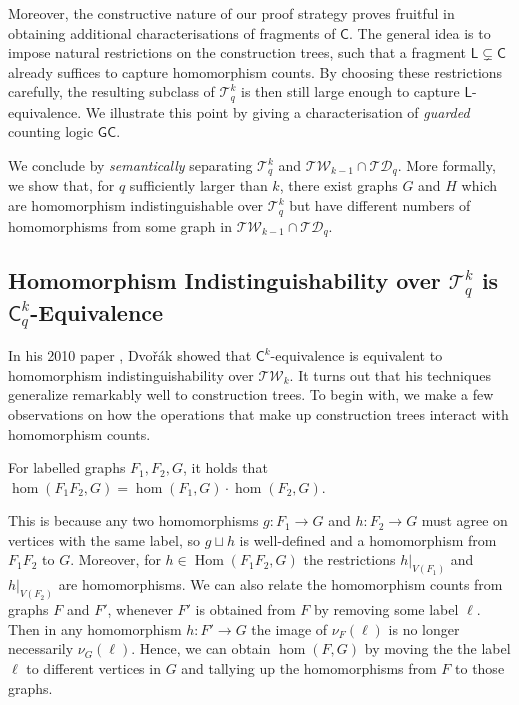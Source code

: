 \documentclass[a4paper,UKenglish,cleveref, autoref, thm-restate]{lipics-v2021}
\newcommand{\TW}{\ensuremath{\mathcal{TW}}}
\newcommand{\Ekq}{\ensuremath{\mathcal{T}_{q}^{k}}}
\newcommand{\lC} {\ensuremath{\mathsf C}}
\newcommand{\lL} {\ensuremath{\mathsf L}}
\newcommand{\lGC}{\ensuremath{\mathsf{GC}}}
\DeclareMathOperator{\HOM}{Hom}
\newcommand\restrict[1]{\vert_{#1}}
\begin{document}
Moreover, the constructive nature of our proof strategy proves fruitful in obtaining additional characterisations of fragments of $\lC$. The general idea is to impose natural restrictions on the construction trees, such that a fragment $\lL \subsetneq \lC$ already suffices to capture homomorphism counts. By choosing these restrictions carefully, the resulting subclass of $\Ekq$ is then still large enough to capture $\lL$-equivalence. We illustrate this point by giving a characterisation of \emph{guarded} counting logic $\lGC$.

We conclude by \emph{semantically} separating $\Ekq$ and $\mathcal{TW}_{k-1} \cap \mathcal{TD}_q$. More formally, we show that, for $q$ sufficiently larger than $k$, there exist graphs $G$ and $H$ which are homomorphism indistinguishable over $\Ekq$ but have different numbers of homomorphisms from some graph in $\mathcal{TW}_{k-1} \cap \mathcal{TD}_q$.


 
\subsection{Homomorphism Indistinguishability over $\Ekq$ is $\lC^k_q$-Equivalence}
\label{subsec:ckq}
In his 2010 paper \cite{dvorak_recognizing_2010}, Dvo\v{r}ák showed that $\lC^k$-equivalence is equivalent to homomorphism indistinguishability over $\TW_k$. It turns out that his techniques generalize remarkably well to construction trees.
To begin with, we make a few observations on how the operations that make up construction trees interact with homomorphism counts.



\begin{observation}\label{prp:homproducts}
  For labelled graphs $F_1, F_2, G$, it holds that $\hom(F_1F_2, G) = \hom(F_1, G) \cdot \hom(F_2, G)$.
\end{observation}

This is because any two homomorphisms $g \colon F_1 \to G$ and $h \colon F_2 \to G$ must agree on vertices with the same label, so $g \sqcup h$ is well-defined and a homomorphism from $F_1F_2$ to $G$. Moreover, for $h \in \HOM(F_1F_2, G)$ the restrictions $h\restrict{V(F_1)}$ and $h\restrict{V(F_2)}$ are homomorphisms. We can also relate the homomorphism counts from graphs $F$ and $F'$, whenever $F'$ is obtained from $F$ by removing some label $\ell$. Then in any homomorphism $h \colon F' \to G$ the image of $\nu_F(\ell)$ is no longer necessarily $\nu_G(\ell)$. Hence, we can obtain $\hom(F, G)$ by moving the the label $\ell$ to different vertices in $G$ and tallying up the homomorphisms from $F$ to those graphs.
\end{document}
